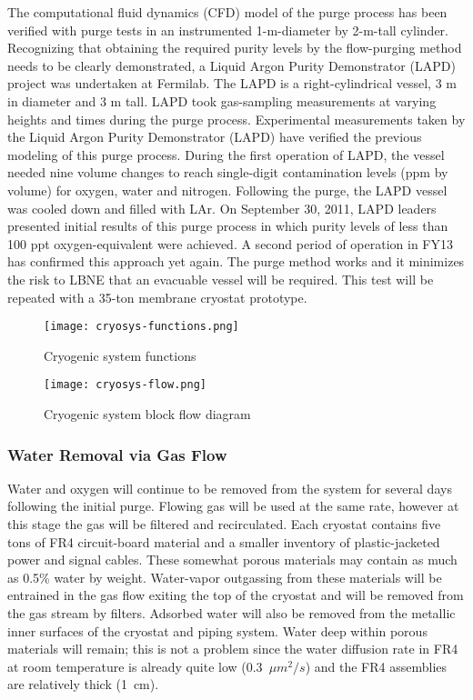 The computational fluid dynamics (CFD) model of the purge process has been verified with
purge tests in an instrumented 1-m-diameter by 2-m-tall cylinder. Recognizing that obtaining
the required purity levels by the flow-purging method needs to be clearly demonstrated, a
Liquid Argon Purity Demonstrator (LAPD) project was undertaken
at Fermilab. The LAPD is a right-cylindrical vessel, 3 m in diameter and 3 m tall. LAPD took gas-sampling measurements
at varying heights and times during the purge process. Experimental measurements taken by
the Liquid Argon Purity Demonstrator (LAPD) have verified the previous modeling of this
purge process. During the first operation of LAPD, the vessel
needed nine volume changes to reach single-digit contamination levels
(ppm by volume) for oxygen, water and nitrogen. Following
the purge, the LAPD vessel was cooled down and filled with LAr.
On September 30, 2011, LAPD leaders presented initial results of this purge process in which
purity levels of less than 100 ppt oxygen-equivalent were achieved.
A second period of operation in FY13 has confirmed this approach yet again. The
purge method works and it minimizes the risk to LBNE that an evacuable vessel will be
required. This test will be repeated with a 35-ton membrane cryostat
prototype.

\begin{figure}[htbp]
\centering
\texttt{[image: cryosys-functions.png]} 
\caption{Cryogenic system functions}
\label{fig:v5ch2-LAr-FD-block-diagram-2014}
\end{figure}

\begin{figure}[htbp]
\centering
\texttt{[image: cryosys-flow.png]} 
\caption{Cryogenic system block flow diagram}
\label{fig:v5ch2-LAr-FD-cryo-process-2014}
\end{figure}



\subsubsection{Water Removal via Gas Flow}

Water and oxygen will continue to be removed from the system for several days following the
initial purge. Flowing gas will be used at the same rate, however at this stage the gas will
be filtered and recirculated. Each cryostat contains five tons of FR4
circuit-board material and a
smaller inventory of plastic-jacketed power and signal cables. These somewhat porous
materials may contain as much as 0.5\% water by weight. Water-vapor outgassing from these
materials will be entrained in the gas flow exiting
the top of the cryostat and will be removed
from the gas stream by filters. Adsorbed water will also be removed from the metallic inner
surfaces of the cryostat and piping system. Water deep within porous materials will remain;
this is not a problem since
the water diffusion rate in FR4 at room temperature is already quite low (0.3~$\mu m^2 /s$) and the FR4 assemblies are relatively thick (1~cm).

